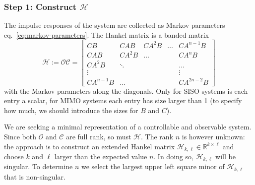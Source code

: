 \subsubsection{Step 1: Construct $\mathcal{H}$}
\label{sec:construct-Hankel}

The impulse responses of the system are collected as Markov parameters eq.~\eqref{eq:markov-parameters}. The Hankel matrix is a banded matrix
\begin{equation}
  \label{eq:hankel-matrix-definition}
  \mathcal{H} := \mathcal{O}\mathcal{C} =
  \begin{bmatrix}
    CB & CAB & CA^2 B & \ldots & CA^{n-1}B \\
    CAB & CA^2B & \ldots & & CA^nB \\
    CA^2B & \ddots & & & \ldots \\
    \vdots & & & & \vdots \\
    CA^{n-1}B & \ldots & & & CA^{2n-2}B
  \end{bmatrix}
\end{equation}
with the Markov parameters along the diagonals. Only for SISO systems is each entry a scalar, for MIMO systems each entry has size larger than 1 (to specify how much, we should introduce the sizes for $B$ and $C$).

We are seeking a minimal representation of a controllable and observable system. Since both $\mathcal{O}$ and $\mathcal{C}$ are full rank, so must $\mathcal{H}$. The rank $n$ is however unknown: the approach is to construct an extended Hankel matrix $\mathcal{H}_{k,\ell}\in \mathbb{R}^{k\times \ell}$ and choose $k$ and $\ell$ larger than the expected value $n$. In doing so, $\mathcal{H}_{k,\ell}$ will be singular. To determine $n$ we select the largest upper left square minor of $\mathcal{H}_{k,\ell}$ that is non-singular.

